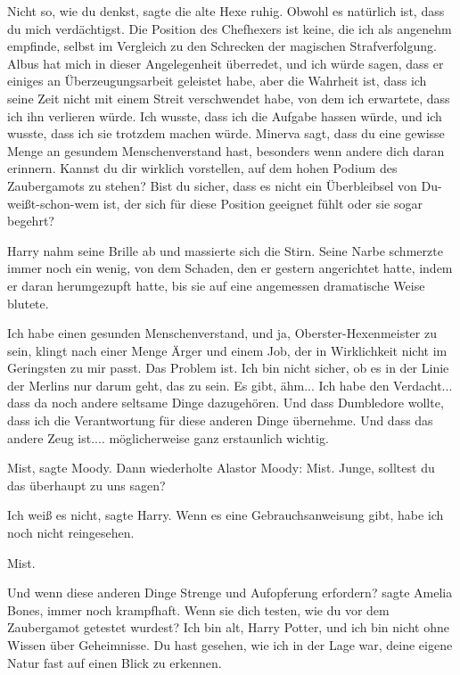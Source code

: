 \glqq{}Nicht so, wie du denkst\grqq{}, sagte die alte Hexe ruhig. \glqq{}Obwohl es
natürlich ist, dass du mich verdächtigst. Die Position des Chefhexers ist keine,
die ich als angenehm empfinde, selbst im Vergleich zu den Schrecken der
magischen Strafverfolgung. Albus hat mich in dieser Angelegenheit überredet, und
ich würde sagen, dass er einiges an Überzeugungsarbeit geleistet habe, aber die
Wahrheit ist, dass ich seine Zeit nicht mit einem Streit verschwendet habe, von
dem ich erwartete, dass ich ihn verlieren würde. Ich wusste, dass ich die
Aufgabe hassen würde, und ich wusste, dass ich sie trotzdem machen würde.
Minerva sagt, dass du eine gewisse Menge an gesundem Menschenverstand hast,
besonders wenn andere dich daran erinnern. Kannst du dir wirklich vorstellen,
auf dem hohen Podium des Zaubergamots zu stehen? Bist du sicher, dass es nicht
ein Überbleibsel von Du-weißt-schon-wem ist, der sich für diese Position
geeignet fühlt oder sie sogar begehrt?\grqq{}

Harry nahm seine Brille ab und massierte sich die Stirn. Seine Narbe schmerzte
immer noch ein wenig, von dem Schaden, den er gestern angerichtet hatte, indem
er daran herumgezupft hatte, bis sie auf eine angemessen dramatische Weise
blutete.

\glqq{}Ich habe einen gesunden Menschenverstand, und ja, Oberster-Hexenmeister zu
sein, klingt nach einer Menge Ärger und einem Job, der in Wirklichkeit nicht im
Geringsten zu mir passt. Das Problem ist. Ich bin nicht sicher, ob es in der
Linie der Merlins nur darum geht, das zu sein. Es gibt, ähm... Ich habe den
Verdacht... dass da noch andere seltsame Dinge dazugehören. Und dass Dumbledore
wollte, dass ich die Verantwortung für diese anderen Dinge übernehme. Und dass
das andere Zeug ist.... möglicherweise ganz erstaunlich wichtig.\grqq{}

\glqq{}Mist\grqq{}, sagte Moody. Dann wiederholte Alastor Moody: \glqq{}Mist.
Junge, solltest du das überhaupt zu uns sagen?\grqq{}

\glqq{}Ich weiß es nicht\grqq{}, sagte Harry. \glqq{}Wenn es eine
Gebrauchsanweisung gibt, habe ich noch nicht reingesehen.\grqq{}

\glqq{}Mist.\grqq{}

\glqq{}Und wenn diese anderen Dinge Strenge und Aufopferung erfordern?\grqq{}
sagte Amelia Bones, immer noch krampfhaft. \glqq{}Wenn sie dich testen, wie du
vor dem Zaubergamot getestet wurdest? Ich bin alt, Harry Potter, und ich bin
nicht ohne Wissen über Geheimnisse. Du hast gesehen, wie ich in der Lage war,
deine eigene Natur fast auf einen Blick zu erkennen.\grqq{}

